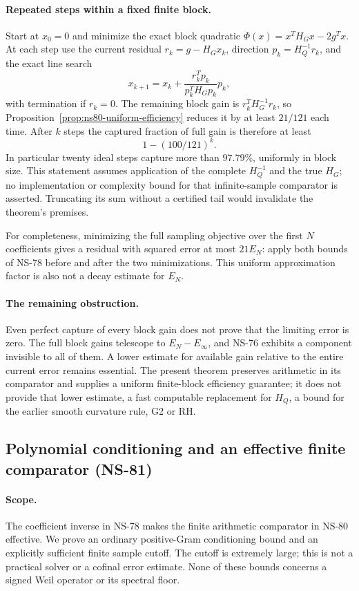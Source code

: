 \documentclass[11pt]{article}
\theoremstyle{remark}
\begin{document}
\paragraph{Repeated steps within a fixed finite block.}
Start at $x_0=0$ and minimize the exact block quadratic
$\Phi(x)=x^TH_Gx-2g^Tx$. At each step use the current residual
$r_k=g-H_Gx_k$, direction $p_k=H_Q^{-1}r_k$, and the exact line search
\[
 x_{k+1}=x_k+\frac{r_k^Tp_k}{p_k^TH_Gp_k}p_k,
\]
with termination if $r_k=0$. The remaining block gain is
$r_k^TH_G^{-1}r_k$, so Proposition~\ref{prop:ns80-uniform-efficiency}
reduces it by at least $21/121$ each time. After $k$ steps the captured
fraction of full gain is therefore at least
\[
 1-(100/121)^k.
\]
In particular twenty ideal steps capture more than $97.79\%$, uniformly
in block size. This statement assumes application of the complete
$H_Q^{-1}$ and the true $H_G$; no implementation or complexity bound for
that infinite-sample comparator is asserted. Truncating its sum without
a certified tail would invalidate the theorem's premises.

For completeness, minimizing the full sampling objective over the first
$N$ coefficients gives a residual with squared error at most $21E_N$:
apply both bounds of NS-78 before and after the two minimizations.
This uniform approximation factor is also not a decay estimate for $E_N$.

\paragraph{The remaining obstruction.}
Even perfect capture of every block gain does not prove that the limiting
error is zero. The full block gains telescope to $E_N-E_\infty$, and
NS-76 exhibits a component invisible to all of them. A lower estimate
for available gain relative to the entire current error remains essential.
The present theorem preserves arithmetic in its comparator and supplies a
uniform finite-block efficiency guarantee; it does not provide that lower
estimate, a fast computable replacement for $H_Q$, a bound for the earlier
smooth curvature rule, G2 or RH.

\subsection{Polynomial conditioning and an effective finite comparator (NS-81)}
\label{sec:ns81-effective-sampling}

\paragraph{Scope.}
The coefficient inverse in NS-78 makes the finite arithmetic comparator
in NS-80 effective. We prove an ordinary positive-Gram conditioning bound
and an explicitly sufficient finite sample cutoff. The cutoff is extremely
large; this is not a practical solver or a cofinal error estimate. None of
these bounds concerns a signed Weil operator or its spectral floor.
\end{document}
